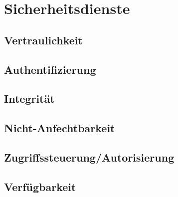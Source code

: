 \chapter{Sicherheitsdienste}
\section{Vertraulichkeit}
\section{Authentifizierung}
\section{Integrität}
\section{Nicht-Anfechtbarkeit}
\section{Zugriffssteuerung/Autorisierung}
\section{Verfügbarkeit}